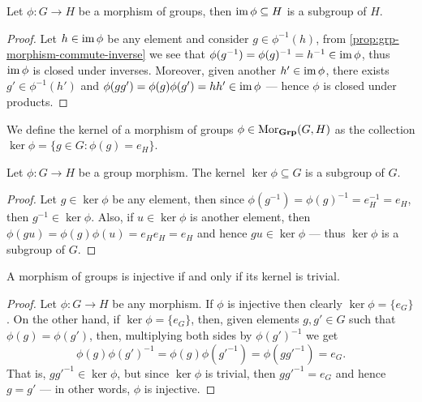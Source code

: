 \begin{proposition}
\label{prop:morphism-image-subgroup}
Let \(\phi: G \to H\) be a morphism of groups, then \(\operatorname{im} \phi \subseteq H\) is
a subgroup of \(H\).
\end{proposition}

\begin{proof}
Let \(h \in \operatorname{im} \phi\) be any element and consider \(g \in \phi^{-1}(h)\), from
\cref{prop:grp-morphism-commute-inverse} we see that \(\phi(g^{-1}) =
\phi(g)^{-1} = h^{-1} \in \operatorname{im} \phi\), thus \(\operatorname{im} \phi\) is closed under
inverses. Moreover, given another \(h' \in \operatorname{im} \phi\), there exists \(g' \in
\phi^{-1}(h')\) and \(\phi(g g') = \phi(g) \phi(g') = h h' \in \operatorname{im} \phi\) ---
hence \(\phi\) is closed under products.
\end{proof}

\begin{definition}[Kernel]
We define the kernel of a morphism of groups \(\phi \in \operatorname{Mor}_{\textbf{Grp}}(G, H)\) as
the collection \(\ker \phi = \{g \in G \colon \phi(g) = e_H\}\).
\end{definition}

\begin{lemma}
\label{lem:kernel-subgroup}
Let \(\phi: G \to H\) be a group morphism. The kernel \(\ker \phi \subseteq G\)
is a subgroup of \(G\).
\end{lemma}

\begin{proof}
Let \(g \in \ker \phi\) be any element, then since \(\phi(g^{-1}) = \phi(g)^{-1}
= e_H^{-1} = e_H\), then \(g^{-1} \in \ker \phi\). Also, if \(u \in \ker \phi\)
is another element, then \(\phi(g u) = \phi(g) \phi(u) = e_H e_H = e_H\) and
hence \(g u \in \ker \phi\) --- thus \(\ker \phi\) is a subgroup of \(G\).
\end{proof}

\begin{proposition}\label{prop: ker-trivial-inj}
A morphism of groups is injective if and only if its kernel is trivial.
\end{proposition}

\begin{proof}
Let \(\phi: G \to H\) be any morphism. If \(\phi\) is injective then clearly
\(\ker\phi = \{e_G\}\). On the other hand, if \(\ker\phi = \{e_G\}\), then,
given elements \(g, g' \in G\) such that \(\phi(g) = \phi(g')\), then,
multiplying both sides by \(\phi{(g')}^{-1}\) we get
\[
  \phi(g) {\phi(g')}^{-1} = \phi(g) \phi(g'^{-1}) = \phi(gg'^{-1}) = e_G.
\]
That is, \(gg'^{-1} \in \ker\phi\), but since \(\ker\phi\) is trivial, then
\(gg'^{-1} = e_G\) and hence \(g = g'\) --- in other words, \(\phi\) is
injective.
\end{proof}

